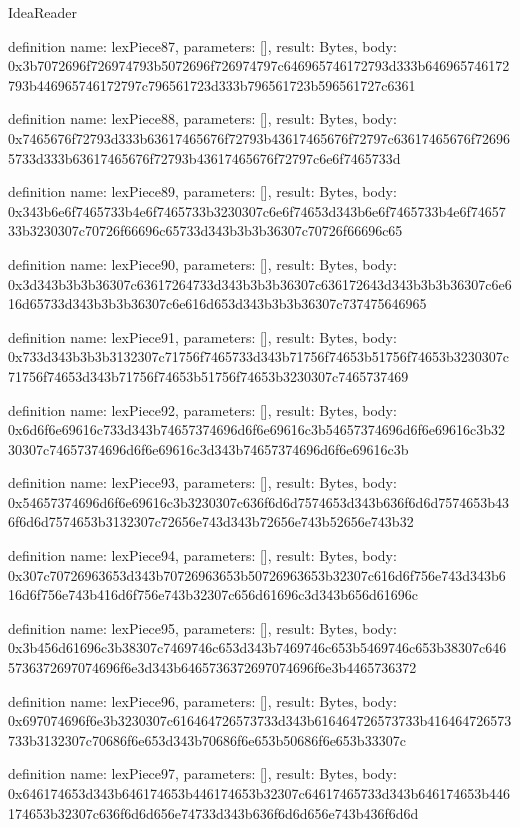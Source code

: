 \begin{lexlean}{IdeaReader}
\begin{semanticmodule}
definition{
  name: lexPiece87,
  parameters: [],
  result: Bytes,
  body: 0x3b7072696f726974793b5072696f726974797c646965746172793d333b646965746172793b446965746172797c796561723d333b796561723b596561727c6361
}

definition{
  name: lexPiece88,
  parameters: [],
  result: Bytes,
  body: 0x7465676f72793d333b63617465676f72793b43617465676f72797c63617465676f726965733d333b63617465676f72793b43617465676f72797c6e6f7465733d
}

definition{
  name: lexPiece89,
  parameters: [],
  result: Bytes,
  body: 0x343b6e6f7465733b4e6f7465733b3230307c6e6f74653d343b6e6f7465733b4e6f7465733b3230307c70726f66696c65733d343b3b3b36307c70726f66696c65
}

definition{
  name: lexPiece90,
  parameters: [],
  result: Bytes,
  body: 0x3d343b3b3b36307c63617264733d343b3b3b36307c636172643d343b3b3b36307c6e616d65733d343b3b3b36307c6e616d653d343b3b3b36307c737475646965
}

definition{
  name: lexPiece91,
  parameters: [],
  result: Bytes,
  body: 0x733d343b3b3b3132307c71756f7465733d343b71756f74653b51756f74653b3230307c71756f74653d343b71756f74653b51756f74653b3230307c7465737469
}

definition{
  name: lexPiece92,
  parameters: [],
  result: Bytes,
  body: 0x6d6f6e69616c733d343b74657374696d6f6e69616c3b54657374696d6f6e69616c3b3230307c74657374696d6f6e69616c3d343b74657374696d6f6e69616c3b
}

definition{
  name: lexPiece93,
  parameters: [],
  result: Bytes,
  body: 0x54657374696d6f6e69616c3b3230307c636f6d6d7574653d343b636f6d6d7574653b436f6d6d7574653b3132307c72656e743d343b72656e743b52656e743b32
}

definition{
  name: lexPiece94,
  parameters: [],
  result: Bytes,
  body: 0x307c70726963653d343b70726963653b50726963653b32307c616d6f756e743d343b616d6f756e743b416d6f756e743b32307c656d61696c3d343b656d61696c
}

definition{
  name: lexPiece95,
  parameters: [],
  result: Bytes,
  body: 0x3b456d61696c3b38307c7469746c653d343b7469746c653b5469746c653b38307c6465736372697074696f6e3d343b6465736372697074696f6e3b4465736372
}

definition{
  name: lexPiece96,
  parameters: [],
  result: Bytes,
  body: 0x697074696f6e3b3230307c616464726573733d343b616464726573733b416464726573733b3132307c70686f6e653d343b70686f6e653b50686f6e653b33307c
}

definition{
  name: lexPiece97,
  parameters: [],
  result: Bytes,
  body: 0x646174653d343b646174653b446174653b32307c64617465733d343b646174653b446174653b32307c636f6d6d656e74733d343b636f6d6d656e743b436f6d6d
}


\end{semanticmodule}
\end{lexlean}
